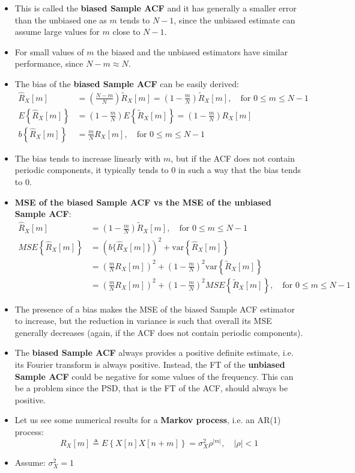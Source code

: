 \begin{itemize}
\item This is called the \textbf{biased Sample ACF} and it has generally a smaller error than the unbiased one as \(m\) tends to \(N-1\), since the unbiased estimate can assume large values for \(m\) close to \(N-1\).
\item For small values of \(m\) the biased and the unbiased estimators have similar performance, since \(N-m\approx N\).
\item The bias of the \textbf{biased Sample ACF} can be easily derived:
\[
\begin{aligned}
\hat{R}_X[m] &= \left( \frac{N-m}{N} \right) \tilde{R}_X[m] = \left(1-\frac{m}{N}\right) \tilde{R}_X[m], \quad \text{for } 0 \leq m \leq N-1
\\[2ex]
E\left\{ \hat{R}_X[m] \right\} &= \left(1-\frac{m}{N}\right) E\left\{ \tilde{R}_X[m] \right\} = \left(1-\frac{m}{N}\right) R_X[m]
\\[2ex]
b\left\{ \hat{R}_X[m] \right\} &= \frac{m}{N} R_X[m], \quad \text{for } 0 \leq m \leq N-1
\end{aligned}
\]
\item The bias tends to increase linearly with \(m\), but if the ACF does not contain periodic components, it typically tends to 0 in such a way that the bias tends to 0.

\item \textbf{MSE of the biased Sample ACF vs the MSE of the unbiased Sample ACF}:
\[
\begin{aligned}
\hat{R}_X[m] &= \left(1-\frac{m}{N}\right) \tilde{R}_X[m], \quad \text{for } 0 \leq m \leq N-1
\\[2ex]
MSE\left\{\hat{R}_X[m]\right\} 
&= \left( b\{\hat{R}_X[m]\} \right)^2 + \mathrm{var}\left\{\hat{R}_X[m]\right\}
\\
&= \left( \frac{m}{N} R_X[m] \right)^2 + \left(1-\frac{m}{N}\right)^2 \mathrm{var}\left\{\tilde{R}_X[m]\right\}
\\
&= \left( \frac{m}{N} R_X[m] \right)^2 + \left(1-\frac{m}{N}\right)^2 MSE\left\{ \tilde{R}_X[m] \right\}, \quad \text{for } 0 \leq m \leq N-1
\end{aligned}
\]
\item The presence of a bias makes the MSE of the biased Sample ACF estimator to increase, but the reduction in variance is such that overall its MSE generally decreases (again, if the ACF does not contain periodic components).

\item The \textbf{biased Sample ACF} always provides a positive definite estimate, i.e.
its Fourier transform is always positive. Instead, the FT of the \textbf{unbiased Sample ACF} could be negative for some values of the frequency. This can be a problem since the PSD, that is the FT of the ACF, should always be positive.
\item Let us see some numerical results for a \textbf{Markov process}, i.e. an AR(1) process:
\[
R_X[m] \triangleq E\left\{ X[n] X[n+m] \right\}
= \sigma_X^2 \rho^{|m|}, \quad |\rho| < 1
\]
\item Assume: \(\sigma_X^2=1\)


\end{itemize}
